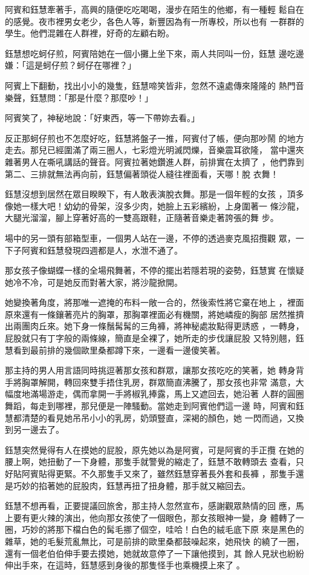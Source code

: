 阿賓和鈺慧牽著手，高興的隨便吃吃喝喝，漫步在陌生的他鄉，有一種輕
鬆自在的感覺。夜市裡男女老少，各色人等，新豐因為有一所專校，所以也有
一群群的學生。他們混雜在人群裡，好奇的左顧右盼。

鈺慧想吃蚵仔煎，阿賓陪她在一個小攤上坐下來，兩人共同叫一份，鈺慧
邊吃邊嫌：「這是蚵仔煎？蚵仔在哪裡？」

阿賓上下翻動，找出小小的幾隻，鈺慧啼笑皆非，忽然不遠處傳來隆隆的
熱門音樂聲，鈺慧問：「那是什麼？那麼吵！」

阿賓笑了，神秘地說：「好東西，等一下帶妳去看。」

反正那蚵仔煎也不怎麼好吃，鈺慧將盤子一推，阿賓付了帳，便向那吵鬧
的地方走去。那兒已經圍滿了兩三圈人，七彩燈光明滅閃爍，音樂震耳欲隆，
當中還夾雜著男人在嘶吼講話的聲音。阿賓拉著她鑽進人群，前排實在太擠了
，他們靠到第二、三排就無法再向前，鈺慧偏著頭從人縫往裡面看，天哪！脫
衣舞！

鈺慧沒想到居然在眾目睽睽下，有人敢表演脫衣舞。那是一個年輕的女孩
，頂多像她一樣大吧！幼幼的骨架，沒多少肉，她臉上五彩繽紛，上身圍著一
條沙龍，大腿光溜溜，腳上穿著好高的一雙高跟鞋，正隨著音樂走著誇張的舞
步。

場中的另一頭有部箱型車，一個男人站在一邊，不停的透過麥克風招攬觀
眾，一下子阿賓和鈺慧發現四週都是人，水泄不通了。

那女孩子像蝴蝶一樣的全場飛舞著，不停的擺出若隱若現的姿勢，鈺慧實
在懷疑她冷不冷，可是她反而對著大家，將沙龍掀開。

她變換著角度，將那唯一遮掩的布料一敞一合的，然後索性將它棄在地上
，裡面原來還有一條鑲著亮片的胸罩，那胸罩裡面必有機關，將她嶙瘦的胸部
居然推擠出兩團肉丘來。她下身一條鬚髯髯的三角褲，將神秘處妝點得更誘惑
，一轉身，屁股就只有丁字般的兩條線，簡直是全裸了，她所走的步伐讓屁股
又特別翹，鈺慧看到最前排的幾個歐里桑都蹲下來，一邊看一邊傻笑著。

那主持的男人用言語同時挑逗著那女孩和群眾，讓那女孩吃吃的笑著，她
轉身背手將胸罩解開，轉回來雙手捂住乳房，群眾簡直沸騰了，那女孩也非常
滿意，大幅度地滿場游走，偶而拿開一手將椒乳捧露，馬上又遮回去，她沿著
人群的圓圈舞蹈，每走到哪裡，那兒便是一陣騷動。當她走到阿賓他們這一邊
時，阿賓和鈺慧都清楚的看見她吊吊小小的乳房，奶頭豎直，深褐的顏色，她
一閃而過，又換到另一邊去了。

鈺慧突然覺得有人在摸她的屁股，原先她以為是阿賓，可是阿賓的手正攬
在她的腰上啊，她扭動了一下身體，那隻手就警覺的縮走了，鈺慧不敢轉頭去
查看，只好貼阿賓貼得更緊。不久那隻手又來了，雖然鈺慧穿著長外套和長褲
，那隻手還是巧妙的掐著她的屁股肉，鈺慧再扭了扭身體，那手就又縮回去。

鈺慧不想再看，正要提議回旅舍，那主持人忽然宣布，感謝觀眾熱情的回
應，馬上要有更火辣的演出，他向那女孩使了一個眼色，那女孩眼神一變，身
體轉了一圈，巧妙的將那下檔白色的髯毛挪了個空，哇哈！白色的絨毛底下原
來是黑色的雜草，她的毛髮荒亂無比，可是前排的歐里桑都鼓噪起來，她飛快
的繞了一圈，還有一個老伯伯伸手要去摸她，她就故意停了一下讓他摸到，其
餘人見狀也紛紛伸出手來，在這時，鈺慧感到身後的那隻怪手也乘機摸上來了
。

